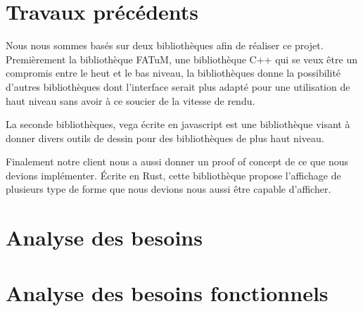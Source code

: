 \documentclass[12pt]{article}
\begin{document}
\section{Travaux précédents}

Nous nous sommes basés sur deux bibliothèques afin de réaliser ce projet.
Premièrement la bibliothèque FATuM, une bibliothèque C++ qui se veux être un compromis entre le heut et le bas niveau, la bibliothèques donne la possibilité d'autres bibliothèques dont l'interface serait plus adapté pour une utilisation de haut niveau sans avoir à ce soucier de la vitesse de rendu.

La seconde bibliothèques, vega écrite en javascript est une bibliothèque visant à donner divers outils de dessin pour des bibliothèques de plus haut niveau.

Finalement notre client nous a aussi donner un proof of concept de ce que nous devions implémenter. Écrite en Rust, cette bibliothèque propose l'affichage de plusieurs type de forme que nous devions nous aussi être capable d'afficher.

\section{Analyse des besoins}
\section{Analyse des besoins fonctionnels}
\end{document}
